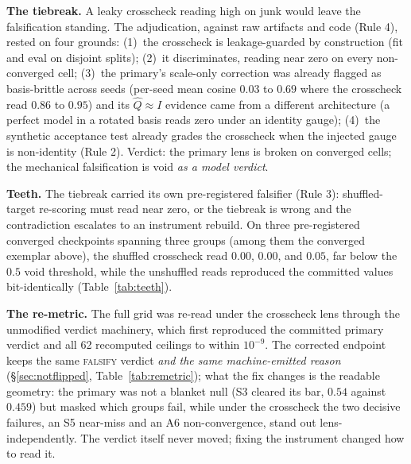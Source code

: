  \textbf{The tiebreak.} A leaky crosscheck reading high on junk would
leave the falsification standing. The adjudication, against raw
artifacts and code
(Rule 4), rested on four grounds:
(1)~the crosscheck is leakage-guarded by construction (fit and eval
on disjoint splits); (2)~it
discriminates, reading near zero on every non-converged
cell; (3)~the primary's scale-only correction was already flagged as
basis-brittle across seeds (per-seed mean cosine $0.03$ to $0.69$
where the crosscheck read $0.86$ to $0.95$) and its
$\hat{Q}\approx I$ evidence came from a different architecture (a
perfect model in a rotated basis reads zero under an identity gauge);
(4)~the synthetic acceptance test already grades the crosscheck when
the injected gauge is non-identity (Rule 2).
Verdict: the primary lens is broken on converged cells; the mechanical
falsification is void \emph{as a model verdict}.

 \textbf{Teeth.} The tiebreak carried its own pre-registered falsifier
(Rule 3): shuffled-target re-scoring must read near zero, or the
tiebreak is wrong and the contradiction escalates to an instrument
rebuild. On three pre-registered converged checkpoints spanning
three groups (among them the converged exemplar above), the shuffled
crosscheck read $0.00$, $0.00$, and
$0.05$, far below the $0.5$ void threshold, while the unshuffled
reads reproduced the committed values bit-identically
(Table~\ref{tab:teeth}).

\textbf{The re-metric.} The full grid was re-read under the crosscheck
lens through the unmodified verdict machinery, which first reproduced
the committed primary verdict and all 62 recomputed ceilings to within
$10^{-9}$.
The corrected endpoint keeps the same \textsc{falsify} verdict
\emph{and the same machine-emitted reason}
(\S\ref{sec:notflipped}, Table~\ref{tab:remetric}); what the fix
changes is the readable geometry: the primary was not a blanket
null (S3 cleared its bar, $0.54$ against $0.459$) but masked which
groups fail, while under the crosscheck the two decisive
failures, an S5 near-miss and an A6 non-convergence, stand out
lens-independently. The verdict itself never moved; fixing the
instrument changed how to read it.
